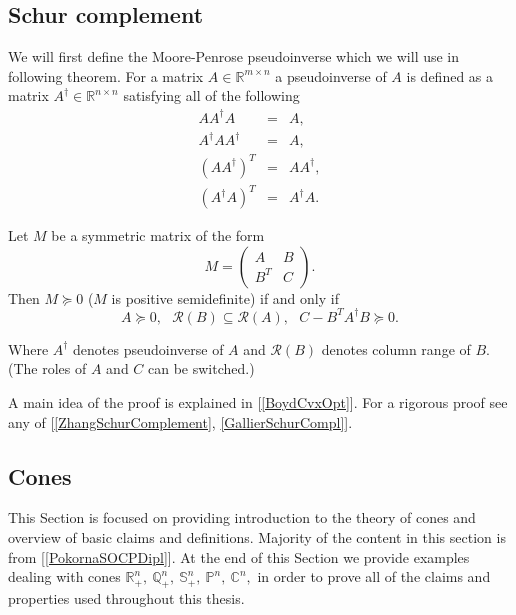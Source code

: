 \documentclass[12pt]{book}
\theoremstyle{definition}
\begin{document}
\begin{appendix}	
\chapter[Appendix]{ }

\section{Schur complement}

We will first define the Moore-Penrose pseudoinverse which we will use in following theorem.
\label{Pseudoinverse}
For a matrix $A\in\mathbb{R}^{m\times n}$ a pseudoinverse of $A$ is defined as a matrix $A^\dagger\in \mathbb{R}^{n\times n}$ satisfying all of the following
\begin{eqnarray*}
AA^\dagger A \ &=& A,\\
A^\dagger A A^\dagger &=& A,\\
(AA^\dagger)^T &=& AA^\dagger,\\
(A^\dagger A)^T &=& A^\dagger A.
\end{eqnarray*}

\label{SchurCompl}
Let $M$ be a symmetric matrix of the form
$$M = \left(\begin{array}{cc}
A & B\\
B^T & C
\end{array}\right).$$ 
Then $M\succeq 0$ ($M$ is positive semidefinite) if and only if 
$$A\succeq 0, \ \ \ \mathcal{R}(B)\subseteq \mathcal{R}(A),\ \ \ C - B^TA^\dagger B \succeq 0.$$


Where $A^\dagger$ denotes pseudoinverse of $A$ and $\mathcal{R}(B)$ denotes column range of $B$. (The roles of $A$ and $C$ can be switched.)\rm 

\proof A main idea of the proof is explained in [\ref{BoydCvxOpt}]. For a rigorous proof see any of [\ref{ZhangSchurComplement}, \ref{GallierSchurCompl}].


\section{Cones}
\label{Cones}
This Section is focused on providing introduction to the theory of cones and overview of basic claims and definitions.
Majority of the content in this section is from [\ref{PokornaSOCPDipl}]. At the end of this Section we provide examples dealing with cones $\mathbb{R}^n_+,\ \mathbb{Q}^n_+,\ \mathbb{S}^n_+, \ \mathbb{P}^n,\ \mathbb{C}^n,$  in order to prove all of the claims and properties used throughout this thesis.


\end{appendix}
\end{document}
